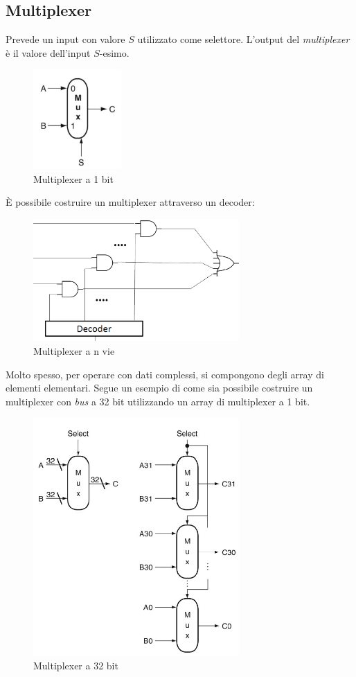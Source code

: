 \documentclass[class=book, crop=false]{standalone}
\begin{document}
\subsection{Multiplexer}
Prevede un input con valore \(S\) utilizzato come selettore. L'output del \emph{multiplexer} è il valore dell'input \(S\)-esimo.
\begin{figure}[H]
	\centering
	\includegraphics[width=0.3\textwidth,keepaspectratio]{multi.png}
	\caption{Multiplexer a 1 bit}
\end{figure}
\`{E} possibile costruire un multiplexer attraverso un decoder:
\begin{figure}[H]
	\centering
	\includegraphics[width=0.7\textwidth,keepaspectratio]{multi_n_vie.png}
	\caption{Multiplexer a n vie}
\end{figure}
Molto spesso, per operare con dati complessi, si compongono degli array di elementi elementari. Segue un esempio di come sia possibile costruire un multiplexer con \emph{bus} a 32 bit utilizzando un array di multiplexer a 1 bit.
\begin{figure}[H]
	\centering
	\includegraphics[width=0.7\textwidth,keepaspectratio]{mux_32bit.png}
	\caption{Multiplexer a 32 bit}
\end{figure}
\end{document}
